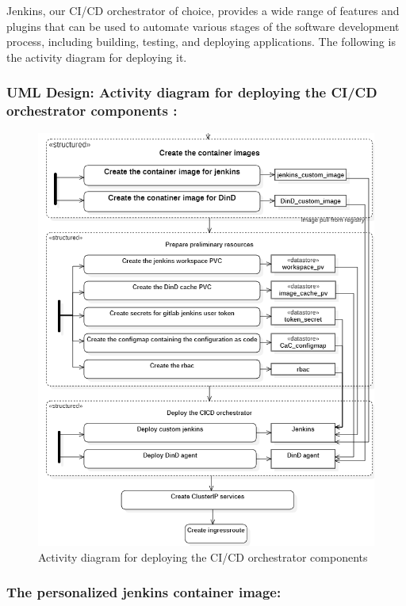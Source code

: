 Jenkins, our CI/CD orchestrator of choice, provides a wide range of features and plugins that can be used to automate various stages of the software development process, including building, testing, and deploying applications. The following is the activity diagram for deploying it. 

 
\subsubsection{UML Design: Activity diagram for deploying the CI/CD orchestrator components : }

\begin{figure}[H]\centering
\includegraphics[width=1.0\textwidth,angle=00]{assets/f44.png}
\caption{Activity diagram for deploying the CI/CD orchestrator components}
\label{fig:Activity diagram for deploying the CI/CD orchestrator components}
\end{figure}
 
\subsubsection{The personalized jenkins container image: }

